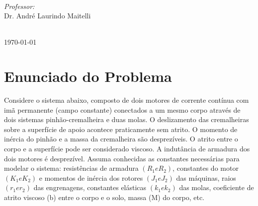 \documentclass[12pt]{report}
\begin{document}
\begin{titlepage}
\begin{minipage}{0.45\textwidth}
\begin{flushleft}
\end{flushleft}
\end{minipage}
~
\begin{minipage}{0.4\textwidth}
\begin{flushright} \large
\emph{Professor:} \\
Dr. André Laurindo Maitelli %
\end{flushright}
\end{minipage}\\[40mm]



{\large \today}\\[2cm] %



\vfill %

\end{titlepage}
	
\section*{Enunciado do Problema}
\linespread{1.3}

\indent Considere o sistema abaixo, composto de dois motores de corrente contínua com imã permanente (campo constante) conectados a um mesmo corpo através de dois sistemas pinhão-cremalheira e duas molas. O deslizamento das cremalheiras sobre a superfície de apoio acontece praticamente sem atrito. O momento de inércia do pinhão e a massa da cremalheira são desprezíveis. O atrito entre o corpo e a superfície pode ser considerado viscoso. A indutância de armadura dos dois motores é desprezível. Assuma conhecidas as constantes necessárias para modelar o sistema: resistências de armadura $(R_1 e R_2)$, constantes do motor $(K_1 e K_2)$ e momentos de inércia dos rotores $(J_1 e J_2)$ das máquinas, raios $(r_1 e r_2)$ das engrenagens, constantes elásticas $(k_1 e k_2)$ das molas, coeficiente de atrito viscoso (b) entre o corpo e o solo, massa (M) do corpo, etc.\\
\end{document}
